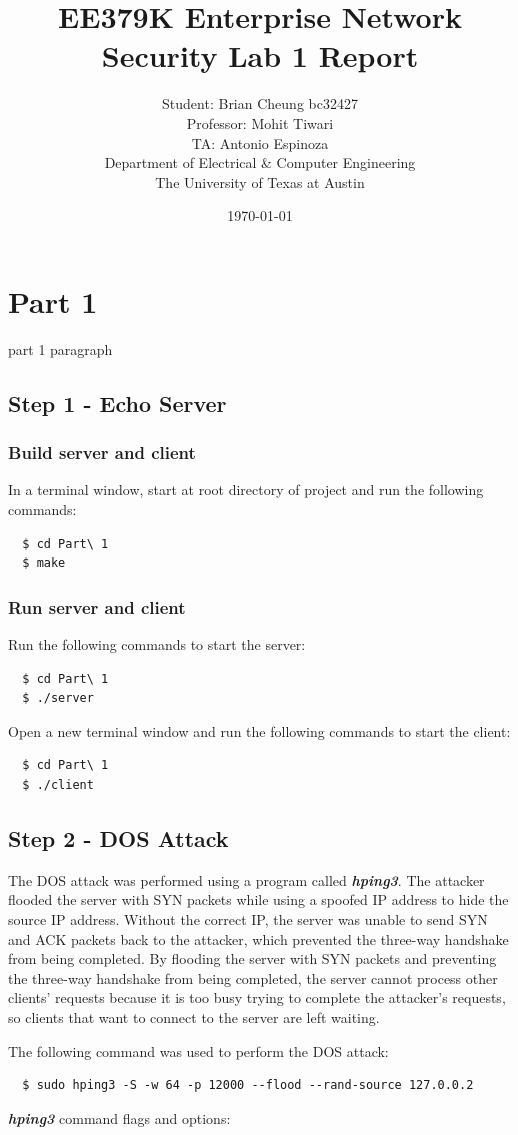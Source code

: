 \documentclass[11pt]{article}
\author{Student: Brian Cheung bc32427 \\ Professor: Mohit Tiwari \\ TA: Antonio Espinoza \\ Department of Electrical \& Computer Engineering \\ The University of Texas at Austin}
\date{\today}
\title{EE379K Enterprise Network Security Lab 1 Report}
\begin{document}
\maketitle
\section{Part 1}
\label{sec:part-1}
part 1 paragraph
\subsection{Step 1 - Echo Server}
\subsubsection{Build server and client}
In a terminal window, start at root directory of project and run the following commands:
\begin{verbatim}
  $ cd Part\ 1
  $ make
\end{verbatim}
\subsubsection{Run server and client}
Run the following commands to start the server:
\begin{verbatim}
  $ cd Part\ 1
  $ ./server
\end{verbatim}
Open a new terminal window and run the following commands to start the client:
\begin{verbatim}
  $ cd Part\ 1
  $ ./client
\end{verbatim}
\subsection{Step 2 - DOS Attack}
The DOS attack was performed using a program called \textbf{\emph{hping3}}.
The attacker flooded the server with SYN packets while using a spoofed IP address to hide the source IP address.
Without the correct IP, the server was unable to send SYN and ACK packets back to the attacker,
which prevented the three-way handshake from being completed.
By flooding the server with SYN packets and preventing the three-way handshake from being completed,
the server cannot process other clients' requests because it is too busy trying to complete the attacker's requests,
so clients that want to connect to the server are left waiting.

\noindent The following command was used to perform the DOS attack:
\begin{verbatim}
  $ sudo hping3 -S -w 64 -p 12000 --flood --rand-source 127.0.0.2
\end{verbatim}
\textbf{\emph{hping3}} command flags and options:
\end{document}
